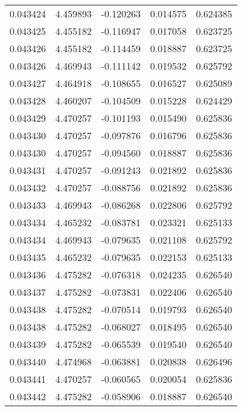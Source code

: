 \begin{tabular}{lrrrr}
0.043424    &  4.459893 & -0.120263 &  0.014575 &             0.624385 \\
0.043425    &  4.455182 & -0.116947 &  0.017058 &             0.623725 \\
0.043426    &  4.455182 & -0.114459 &  0.018887 &             0.623725 \\
0.043426    &  4.469943 & -0.111142 &  0.019532 &             0.625792 \\
0.043427    &  4.464918 & -0.108655 &  0.016527 &             0.625089 \\
0.043428    &  4.460207 & -0.104509 &  0.015228 &             0.624429 \\
0.043429    &  4.470257 & -0.101193 &  0.015490 &             0.625836 \\
0.043430    &  4.470257 & -0.097876 &  0.016796 &             0.625836 \\
0.043430    &  4.470257 & -0.094560 &  0.018887 &             0.625836 \\
0.043431    &  4.470257 & -0.091243 &  0.021892 &             0.625836 \\
0.043432    &  4.470257 & -0.088756 &  0.021892 &             0.625836 \\
0.043433    &  4.469943 & -0.086268 &  0.022806 &             0.625792 \\
0.043434    &  4.465232 & -0.083781 &  0.023321 &             0.625133 \\
0.043434    &  4.469943 & -0.079635 &  0.021108 &             0.625792 \\
0.043435    &  4.465232 & -0.079635 &  0.022153 &             0.625133 \\
0.043436    &  4.475282 & -0.076318 &  0.024235 &             0.626540 \\
0.043437    &  4.475282 & -0.073831 &  0.022406 &             0.626540 \\
0.043438    &  4.475282 & -0.070514 &  0.019793 &             0.626540 \\
0.043438    &  4.475282 & -0.068027 &  0.018495 &             0.626540 \\
0.043439    &  4.475282 & -0.065539 &  0.019540 &             0.626540 \\
0.043440    &  4.474968 & -0.063881 &  0.020838 &             0.626496 \\
0.043441    &  4.470257 & -0.060565 &  0.020054 &             0.625836 \\
0.043442    &  4.475282 & -0.058906 &  0.018887 &             0.626540 \\

\end{tabular}
